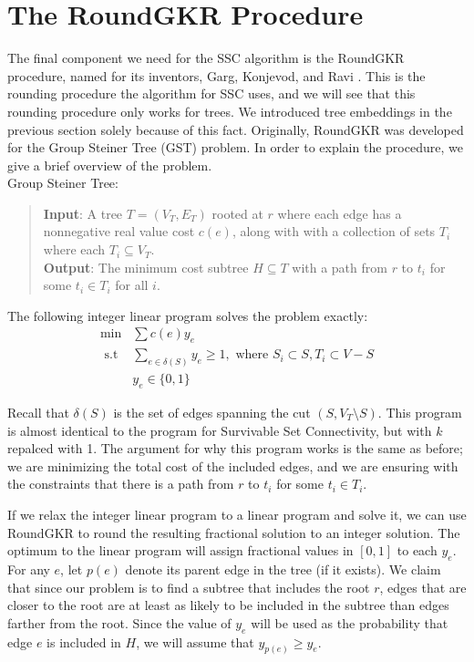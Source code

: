 \documentclass[12pt]{article}
\begin{document}
\section{The RoundGKR Procedure}

The final component we need for the SSC algorithm is the RoundGKR procedure, named for its inventors, Garg, Konjevod, and Ravi \cite{GKR}. This is the rounding procedure the algorithm for SSC uses, and we will see that this rounding procedure only works for trees. We introduced tree embeddings in the previous section solely because of this fact. Originally, RoundGKR was developed for the Group Steiner Tree (GST) problem. In order to explain the procedure, we give a brief overview of the problem. \\

Group Steiner Tree:
\begin{quote}
\textbf{Input}: A tree $T = (V_T, E_T)$ rooted at $r$ where each edge has a nonnegative real value cost $c(e)$, along with with a collection of sets $T_i$ where each $T_i \subseteq V_T$.\\
\textbf{Output}: The minimum cost subtree $H \subseteq T$ with a path from $r$ to $t_i$ for some $t_i \in T_i$ for all $i$.
\end{quote}

The following integer linear program solves the problem exactly:
\begin{align}
\min & \sum c(e) y_e  \\
\text{ s.t } & \sum_{e \in \delta(S)} y_e \geq 1, \text{ where } S_i \subset S, T_i \subset V - S\\
&y_e \in \{0,1\}
\end{align}

Recall that $\delta(S)$ is the set of edges spanning the cut $(S,V_T \setminus S)$. This program is almost identical to the program for Survivable Set Connectivity, but with $k$ repalced with 1. The argument for why this program works is the same as before; we are minimizing the total cost of the included edges, and we are ensuring with the constraints that there is a path from $r$ to $t_i$ for some $t_i \in T_i$.

If we relax the integer linear program to a linear program and solve it, we can use RoundGKR to round the resulting fractional solution to an integer solution. The optimum to the linear program will assign fractional values in $[0,1]$ to each $y_e$. For any $e$, let $p(e)$ denote its parent edge in the tree (if it exists). We claim that since our problem is to find a subtree that includes the root $r$, edges that are closer to the root are at least as likely to be included in the subtree than edges farther from the root. Since the value of $y_e$ will be used as the probability that edge $e$ is included in $H$, we will assume that $y_{p(e)} \geq y_e$. 
\end{document}
